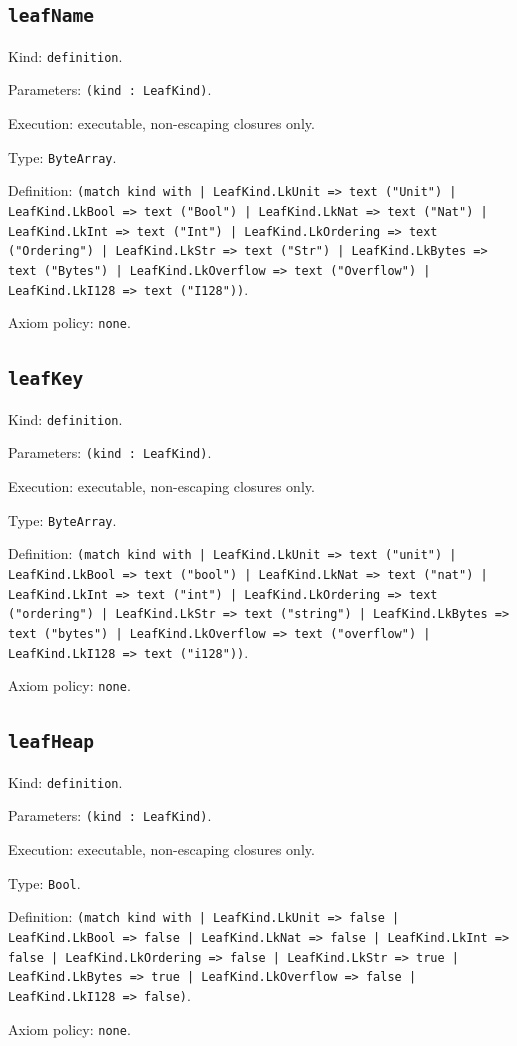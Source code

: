 \documentclass[11pt]{article}
\begin{document}
\subsection*{\texttt{leafName}}
\noindent Kind: \texttt{definition}.\par
\noindent Parameters: \texttt{(kind : LeafKind)}.\par
\noindent Execution: executable, non-escaping closures only.\par
\noindent Type: \texttt{ByteArray}.\par
\noindent Definition: \texttt{(match kind with | LeafKind.LkUnit => text ("Unit") | LeafKind.LkBool => text ("Bool") | LeafKind.LkNat => text ("Nat") | LeafKind.LkInt => text ("Int") | LeafKind.LkOrdering => text ("Ordering") | LeafKind.LkStr => text ("Str") | LeafKind.LkBytes => text ("Bytes") | LeafKind.LkOverflow => text ("Overflow") | LeafKind.LkI128 => text ("I128"))}.\par
\noindent Axiom policy: \texttt{none}.\par
\subsection*{\texttt{leafKey}}
\noindent Kind: \texttt{definition}.\par
\noindent Parameters: \texttt{(kind : LeafKind)}.\par
\noindent Execution: executable, non-escaping closures only.\par
\noindent Type: \texttt{ByteArray}.\par
\noindent Definition: \texttt{(match kind with | LeafKind.LkUnit => text ("unit") | LeafKind.LkBool => text ("bool") | LeafKind.LkNat => text ("nat") | LeafKind.LkInt => text ("int") | LeafKind.LkOrdering => text ("ordering") | LeafKind.LkStr => text ("string") | LeafKind.LkBytes => text ("bytes") | LeafKind.LkOverflow => text ("overflow") | LeafKind.LkI128 => text ("i128"))}.\par
\noindent Axiom policy: \texttt{none}.\par
\subsection*{\texttt{leafHeap}}
\noindent Kind: \texttt{definition}.\par
\noindent Parameters: \texttt{(kind : LeafKind)}.\par
\noindent Execution: executable, non-escaping closures only.\par
\noindent Type: \texttt{Bool}.\par
\noindent Definition: \texttt{(match kind with | LeafKind.LkUnit => false | LeafKind.LkBool => false | LeafKind.LkNat => false | LeafKind.LkInt => false | LeafKind.LkOrdering => false | LeafKind.LkStr => true | LeafKind.LkBytes => true | LeafKind.LkOverflow => false | LeafKind.LkI128 => false)}.\par
\noindent Axiom policy: \texttt{none}.\par
\end{document}
